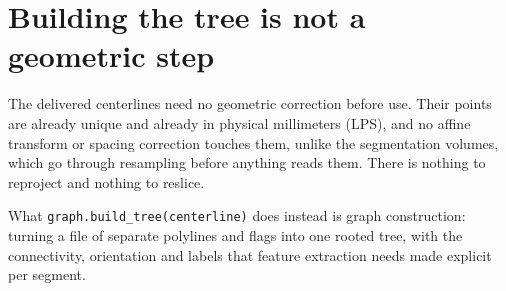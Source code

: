 
\section*{Building the tree is not a geometric step}

The delivered centerlines need no geometric correction before use. Their points are already
unique and already in physical millimeters (LPS), and no affine transform or spacing correction
touches them, unlike the segmentation volumes, which go through resampling before anything reads
them. There is nothing to reproject and nothing to reslice.

What \texttt{graph.build\_tree(centerline)} does instead is graph construction: turning a file of
separate polylines and flags into one rooted tree, with the connectivity, orientation and labels
that feature extraction needs made explicit per segment.

